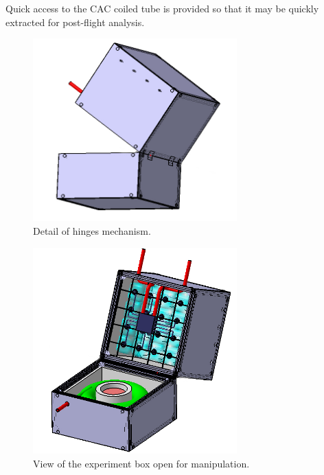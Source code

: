 Quick access to the CAC coiled tube is provided so that it may be quickly extracted for post-flight analysis.


\begin{figure}[!ht]
    \centering
    \includegraphics[width=0.7\textwidth]{4-experiment-design/img/hinges.jpg}
    \caption{Detail of hinges mechanism.}
    \label{open_box_1}
\end{figure}


\begin{figure}[!ht]
    \centering
    \includegraphics[width=0.7\textwidth]{4-experiment-design/img/open_box.jpg}
    \caption{View of the experiment box open for manipulation.}
    \label{open_box_2}
\end{figure}

